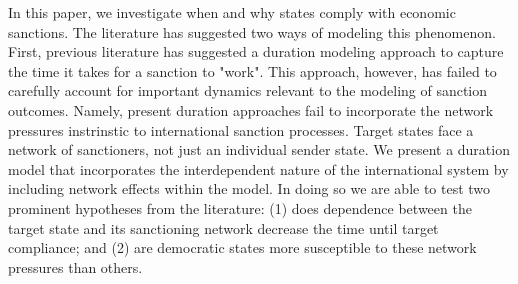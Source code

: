 In this paper, we investigate when and why states comply with economic sanctions.  The literature has suggested two ways of modeling this phenomenon. First, previous literature has suggested a duration modeling approach to capture the time it takes for a sanction to "work". This approach, however, has failed to carefully account for important dynamics relevant to the modeling of sanction outcomes. Namely, present duration approaches fail to incorporate the network pressures instrinstic to international sanction processes. Target states face a network of sanctioners, not just an individual sender state. We present a duration model that incorporates the interdependent nature of the international system by including network effects within the model. In doing so we are able to test two prominent hypotheses from the literature: (1) does dependence between the target state and its sanctioning network decrease the time until target compliance; and (2) are democratic states more susceptible to these network pressures than others. 